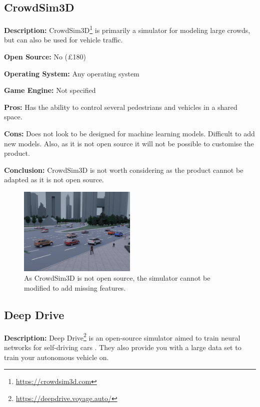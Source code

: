 \subsection{CrowdSim3D}
\textbf{Description:} CrowdSim3D\footnote{\url{https://crowdsim3d.com}} is primarily a simulator for modeling large crowds, but can also be used for vehicle traffic. 

\textbf{Open Source:} No (£180)

\textbf{Operating System:} Any operating system

\textbf{Game Engine:} Not specified

\textbf{Pros:} Has the ability to control several pedestrians and vehicles in a shared space.

\textbf{Cons:} Does not look to be designed for machine learning models. Difficult to add new models. Also, as it is not open source it will not be possible to customise the product. 

\textbf{Conclusion:} CrowdSim3D is not worth considering as the product cannot be adapted as it is not open source. 

\begin{figure}[H]
    \centering
    \includegraphics[width=0.5\textwidth]{03_Background/Appendix/Simulators/CrowdSim.JPG}
    \caption{As CrowdSim3D is not open source, the simulator cannot be modified to add missing features.}
\end{figure}


\subsection{Deep Drive}
\textbf{Description:} Deep Drive\footnote{\url{https://deepdrive.voyage.auto/}} is an open-source simulator aimed to train neural networks for self-driving cars \cite{DeepDrive_Website}. They also provide you with a large data set to train your autonomous vehicle on. 

